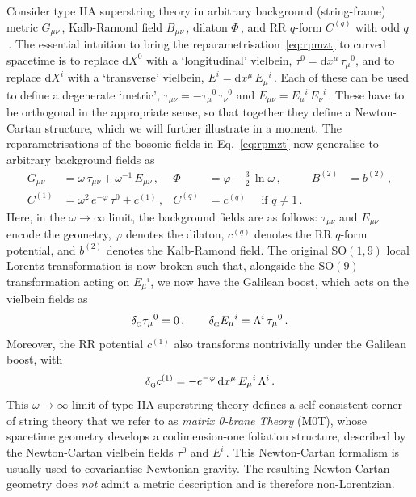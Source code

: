 \documentclass[11pt]{article}
\newcommand{\be}{\begin{equation}}
\newcommand{\ee}{\end{equation}}
\renewcommand{\emph}[1]{\textit{#1}}
\newcommand{\dd}{\mathrm{d}}
\begin{document}
Consider type IIA superstring theory in arbitrary background (string-frame) metric $G_{\mu\nu}$\,, Kalb-Ramond field $B_{\mu\nu}$\,, dilaton $\Phi$\,, and RR $q$-form $C^{(q)}$ with odd $q$\,. 
The essential intuition to bring the reparametrisation~\eqref{eq:rpmzt} to curved spacetime is to replace $\dd X^0$ with a ‘longitudinal’ vielbein, $\tau^0 = \dd x^\mu \, \tau^{}_\mu{}^0$, and to replace $\dd X^i$ with a ‘transverse’ vielbein, $E^i = \dd x^\mu \, E^{}_\mu{}^i$\,. Each of these can be used to define a degenerate ‘metric’, $\tau^{}_{\mu\nu} = - \tau^{}_\mu{}^0 \, \tau^{}_\nu{}^0$ and $E^{}_{\mu\nu} = E^{}_\mu{}^i \, E^{}_\nu{}^i$\,. These have to be orthogonal in the appropriate sense, so that together they define a Newton-Cartan structure, which we will further illustrate in a moment. The reparametrisations of the bosonic fields in Eq.~\eqref{eq:rpmzt} now generalise to arbitrary background fields as
%
\begin{subequations} \label{eq:rpgcfb}
\begin{align}
    G_{\mu\nu} & = \omega \, \tau^{}_{\mu\nu} + \omega^{-1} \, E^{}_{\mu\nu}\,, 
        &
    \Phi & = \varphi - \tfrac{3}{2} \, \ln \omega\,,
        &
    B^{(2)} &= b^{(2)}\,, \\[4pt]
    C^{(1)} & = \omega^2 \, e^{-\varphi} \, \tau^0 + c^{(1)}\,,
        &
    C^{(q)} & =c^{(q)} \quad\text{ if } q \neq 1\,.
\end{align}
\end{subequations}
%
Here, in the $\omega \rightarrow \infty$ limit, the background fields are as follows: $\tau_{\mu\nu}$ and $E_{\mu\nu}$ encode the geometry, $\varphi$ denotes the dilaton, $c^{(q)}$ denotes the RR $q$-form potential, and $b^{(2)}$ denotes the Kalb-Ramond field. The original $\mathrm{SO}(1,9)$ local Lorentz transformation is now broken such that,  alongside the $\mathrm{SO}(9)$ transformation acting on $E_\mu{}^i$, we now have the Galilean boost, which acts on the vielbein fields as
%
\be
    \delta^{}_\text{\scalebox{0.8}{G}} \tau_\mu{}^0 = 0\,,
        \qquad%
    \delta^{}_\text{\scalebox{0.8}{G}} E_\mu{}^i = \Lambda^i \, \tau_\mu{}^0\,.
\ee
%
Moreover, the RR potential $c^{(1)}$ also transforms nontrivially under the Galilean boost, with
%
\be \label{eq:gbtc1e}
    \delta^{}_\text{\scalebox{0.8}{G}} c^{(1)} = -e^{-\varphi} \, \dd x^\mu \, E_\mu{}^i \, \Lambda^i \,. 
\ee 
%
This $\omega \rightarrow \infty$ limit of type IIA superstring theory defines a self-consistent corner of string theory that we refer to as \emph{matrix 0-brane Theory} (M0T), whose spacetime geometry develops a codimension-one foliation structure, described by the Newton-Cartan vielbein fields $\tau^0$ and $E^i$\,. This Newton-Cartan formalism is usually used to covariantise Newtonian gravity. The resulting Newton-Cartan geometry does \emph{not} admit a metric description and is therefore non-Lorentzian. 
\end{document}
